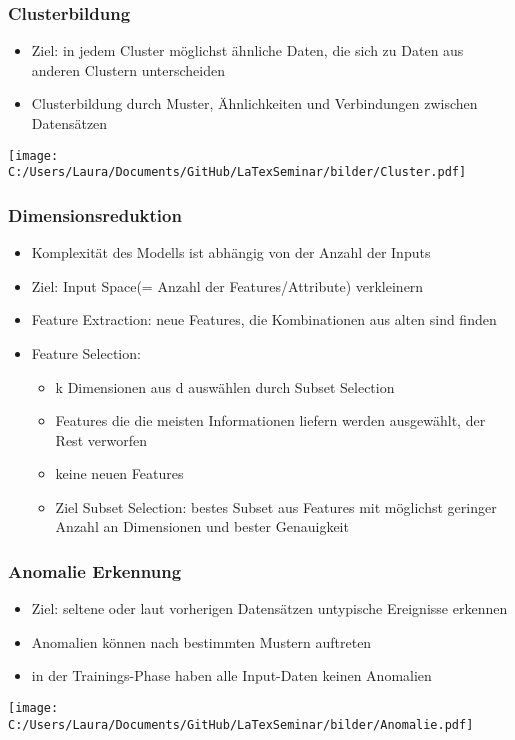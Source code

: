\documentclass[11pt]{beamer}
\begin{document}
	\begin{frame}
		\frametitle{Clusterbildung}
		\begin{itemize}
			\item Ziel: in jedem Cluster möglichst ähnliche Daten, die sich zu Daten aus anderen Clustern unterscheiden
			\item Clusterbildung durch Muster, Ähnlichkeiten und Verbindungen zwischen Datensätzen
		\end{itemize}
		\texttt{[image: C:/Users/Laura/Documents/GitHub/LaTexSeminar/bilder/Cluster.pdf]}
	\end{frame}
	
	\begin{frame}
		\frametitle{Dimensionsreduktion}
		\begin{itemize}
			\item Komplexität des Modells ist abhängig von der Anzahl der Inputs
			\item Ziel: Input Space(= Anzahl der Features/Attribute) verkleinern
			\item Feature Extraction: neue Features, die Kombinationen aus alten sind finden 
			\item Feature Selection: 
				\begin{itemize}
					\item k Dimensionen aus d auswählen durch Subset Selection
					\item Features die die meisten Informationen liefern werden ausgewählt, der Rest verworfen
					\item keine neuen Features
					\item Ziel Subset Selection: bestes Subset aus Features mit möglichst geringer Anzahl an Dimensionen und bester Genauigkeit
				\end{itemize}
		\end{itemize}  
	\end{frame}
	
	\begin{frame}
		\frametitle{Anomalie Erkennung}
		\begin{itemize}
			\item Ziel: seltene oder laut vorherigen Datensätzen untypische Ereignisse erkennen
			\item Anomalien können nach bestimmten Mustern auftreten
			\item in der Trainings-Phase haben alle Input-Daten keinen Anomalien
		\end{itemize}
		\texttt{[image: C:/Users/Laura/Documents/GitHub/LaTexSeminar/bilder/Anomalie.pdf]}
	\end{frame}
	
\end{document}
